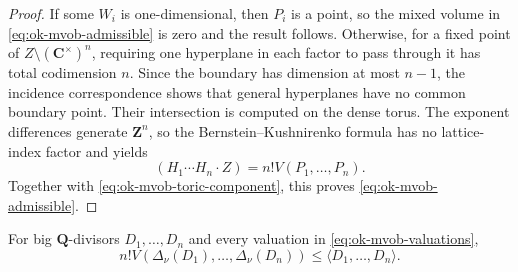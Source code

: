 \begin{proof}
If some $W_i$ is one-dimensional, then $P_i$ is a point, so the mixed
volume in \eqref{eq:ok-mvob-admissible} is zero and the result follows.
Otherwise, for a fixed point of
$Z\setminus(\mathbf C^\times)^n$, requiring one hyperplane in each factor
to pass through it has total codimension $n$.  Since the boundary has
dimension at most $n-1$, the incidence correspondence shows that general
hyperplanes have no common boundary point.  Their intersection is computed
on the dense torus.  The exponent differences generate $\mathbf Z^n$, so
the Bernstein--Kushnirenko formula \cite{Ber75} has no lattice-index factor
and yields
\[
                    (H_1\cdots H_n\cdot Z)=n!V(P_1,\ldots,P_n).
\]
Together with \eqref{eq:ok-mvob-toric-component}, this proves
\eqref{eq:ok-mvob-admissible}.
\end{proof}

\begin{proposition}\label{prop:ok-mvob-movable-upper}
For big $\mathbf Q$-divisors $D_1,\ldots,D_n$ and every valuation in
\eqref{eq:ok-mvob-valuations},
\[
 n!V(\Delta_\nu(D_1),\ldots,\Delta_\nu(D_n))
 \leq\langle D_1,\ldots,D_n\rangle.
\tag{55.36}\label{eq:ok-mvob-movable-upper}
\]
\end{proposition}

